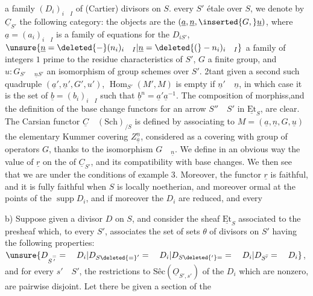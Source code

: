  a family $(D_i)_{i\quad I}$ of (Cartier) divisors on $S$.  every $S'$ étale over $S$, we denote by $\underline{C}_{S'}$ the following category: the objects are the   $(\underline{a},\underline{n},\inserted{G,}\underline{u})$, where $\underline{a}=(a_i)_{i\quad I}$ is a family of equations for the $D_{iS'}$, $\unsure{\underline{n}=\deleted{-}(n_i)_{i\quad I}|\underline{n}=\deleted{(}-n_i)_{i\quad I}}$ a family of integers $1$ prime to the residue characteristics of $S'$,  $G$ a finite group, and $u:G_{S'}\quad{}_{\underline{n}S'}$ an isomorphism of group schemes over $S'$. 2tant given a second such quadruple  $(\underline{a}',\underline{n}',G',u')$,  $\operatorname{Hom}_{S'}(M',M)$ is empty  if $\underline{n}'\quad\underline{n}$, in which case it is the set of $\underline{b}=(b_i)_{i\quad I}$ such that $\underline{b}^{n}=\underline{a}'\underline{a}^{-1}$. The composition of morphiss,and the definition of the base change functors for an arrow $S''\quad S'$ in $\underline{\mathrm{Et}}_S$, are clear. The Carsian functor $\underline{C}\quad(\mathrm{Sch})_{/S}$ is defined by associating to $M=(\underline{a},\underline{n},G,\underline{u})$ the elementary Kummer covering $Z_{\underline{a}}^{\underline{n}}$,   considered as a covering with group of operators $G$, thanks to the isomorphism $G\quad{}_{\underline{n}}$. We define in an obvious way the value of $\underline{r}$ on the  of $\underline{C}_{S'}$, and its compatibility with base changes. We then see that we are under the conditions of example 3. Moreover, the functor $\underline{r}$ is faithful, and it is fully faithful when $S$ is  locally noetherian, and moreover ormal at the points of the $\operatorname{supp}D_i$, and if moreover the $D_i$ are reduced, and every 

b) Suppose given a divisor $D$ on $S$,  and consider the sheaf  $\underline{\mathrm{Et}}_S$ associated to the presheaf which, to every $S'$, associates the set of  sets   $\theta$ of divisors on $S'$ having the following properties: $\unsure{D_{S\overset{=}{'}}=\quad D_i|D_{S\deleted{=}'}=\quad D_i|D_{S\deleted{'}=} =\quad D_i|D_{S\bar{'}}=\quad D_i}$, and for every $s'\quad S'$, the  restrictions to $\text{Sêc}(\underline{O}_{S',s'})$ of the $D_i$ which are nonzero, are pairwise disjoint. Let there be given a section of the
